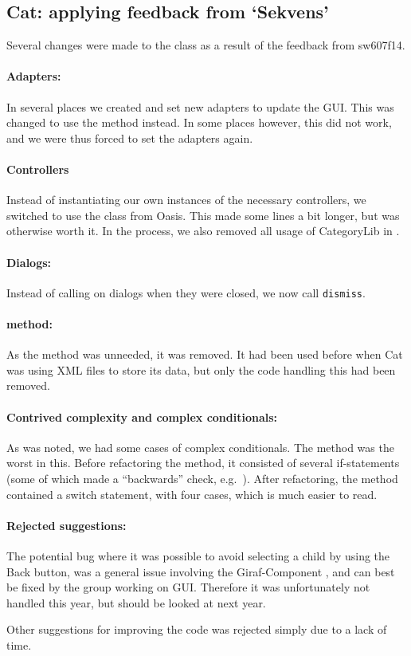 \subsection{Cat: applying feedback from `Sekvens'}\label{subsec:collab_catresult}
Several changes were made to the class  as a result of the feedback from sw607f14.

\paragraph{Adapters:}
In several places we created and set new adapters to update the GUI. This was changed to use the  method instead. In some places however, this did not work, and we were thus forced to set the adapters again.

\paragraph{Controllers}
Instead of instantiating our own instances of the necessary controllers, we switched to use the  class from Oasis. This made some lines a bit longer, but was otherwise worth it. In the process, we also removed all usage of CategoryLib in .

\paragraph{Dialogs:}
Instead of calling  on dialogs when they were closed, we now call \texttt{dismiss}.

\paragraph{ method:}
As the  method was unneeded, it was removed. It had been used before when Cat was using XML files to store its data, but only the code handling this had been removed.

\paragraph{Contrived complexity and complex conditionals:}
As was noted, we had some cases of complex conditionals. The  method was the worst in this. Before refactoring the method, it consisted of several if-statements (some of which made a ``backwards'' check, e.g.\ ). After refactoring, the method contained a switch statement, with four cases, which is much easier to read.

\paragraph{Rejected suggestions:}
The potential bug where it was possible to avoid selecting a child by using the Back button, was a general issue involving the Giraf-Component , and can best be fixed by the group working on GUI. Therefore it was unfortunately not handled this year, but should be looked at next year.

Other suggestions for improving the code was rejected simply due to a lack of time.